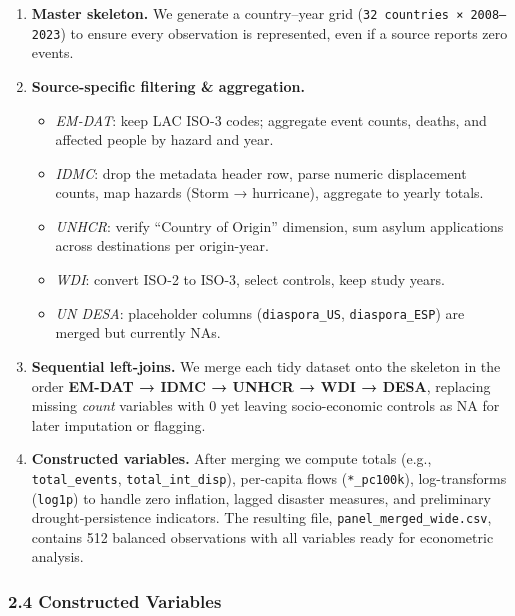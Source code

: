 \documentclass[
  11pt,
]{article}
\providecommand{\tightlist}{%
  \setlength{\itemsep}{0pt}\setlength{\parskip}{0pt}}
\begin{document}
\begin{enumerate}
\def\labelenumi{\arabic{enumi}.}
\item
  \textbf{Master skeleton.} We generate a country--year grid
  (\texttt{32\ countries\ ×\ 2008–2023}) to ensure every observation is
  represented, even if a source reports zero events.
\item
  \textbf{Source-specific filtering \& aggregation.}

  \begin{itemize}
  \tightlist
  \item
    \emph{EM-DAT}: keep LAC ISO-3 codes; aggregate event counts, deaths,
    and affected people by hazard and year.\\
  \item
    \emph{IDMC}: drop the metadata header row, parse numeric
    displacement counts, map hazards (Storm → hurricane), aggregate to
    yearly totals.\\
  \item
    \emph{UNHCR}: verify ``Country of Origin'' dimension, sum asylum
    applications across destinations per origin-year.\\
  \item
    \emph{WDI}: convert ISO-2 to ISO-3, select controls, keep study
    years.\\
  \item
    \emph{UN DESA}: placeholder columns (\texttt{diaspora\_US},
    \texttt{diaspora\_ESP}) are merged but currently NAs.
  \end{itemize}
\item
  \textbf{Sequential left-joins.} We merge each tidy dataset onto the
  skeleton in the order \textbf{EM-DAT → IDMC → UNHCR → WDI → DESA},
  replacing missing \emph{count} variables with 0 yet leaving
  socio-economic controls as NA for later imputation or flagging.
\item
  \textbf{Constructed variables.} After merging we compute totals (e.g.,
  \texttt{total\_events}, \texttt{total\_int\_disp}), per-capita flows
  (\texttt{*\_pc100k}), log-transforms (\texttt{log1p}) to handle zero
  inflation, lagged disaster measures, and preliminary
  drought-persistence indicators. The resulting file,
  \texttt{panel\_merged\_wide.csv}, contains 512 balanced observations
  with all variables ready for econometric analysis.
\end{enumerate}

\subsubsection{2.4 Constructed Variables}\label{constructed-variables}
\end{document}
